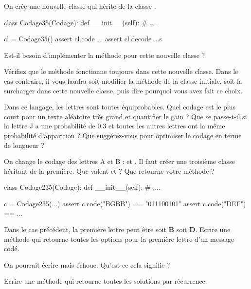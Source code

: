 \begin{xexercice}
On crée une nouvelle classe  qui hérite de la classe .

\begin{verbatimx}
class Codage35(Codage):
    def __init__(self):
        # ....

cl = Codage35()
assert cl.code ...
assert cl.decode ...s
\end{verbatimx}

Est-il besoin d'implémenter la méthode  pour cette nouvelle classe ?

\exequest Vérifiez que le méthode  fonctionne toujours dans cette nouvelle classe. Dans le cas contraire,
il vous faudra soit modifier la méthode de la classe initiale, soit la surcharger dans cette nouvelle classe,
puis dire pourquoi vous avez fait ce choix.

\exequest Dans ce langage, les lettres sont toutes équiprobables.
Quel codage est le plus court pour un texte aléatoire très grand et quantifier le gain ?
Que se passe-t-il si la lettre J a une probabilité de 0.3 et toutes les autres lettres ont la même probabilité
d'apparition ? Que suggérez-vous pour optimiser le codage en terme de longueur ?

\exequest On change le codage des lettres A et B :  et . Il faut créer une troisième classe
héritant de la première. Que valent  et  ?
Que retourne votre méthode  ?

\begin{verbatimx}
class Codage235(Codage):
    def __init__(self):
        # ....

c = Codage235(...)
assert c.code("BGBB") == "011100101"
assert c.code("DEF") == ...
\end{verbatimx}

\exequest Dans le cas précédent, la première lettre peut être soit \textbf{B} soit \textbf{D}.
Ecrire une méthode qui retourne toutes les options pour la première lettre d'un message codé.

\exequest On pourrait écrire  mais
 échoue. Qu'est-ce cela signifie ?


\exequest Ecrire une méthode  qui retourne toutes les solutions par récurrence.


\end{xexercice}




%
